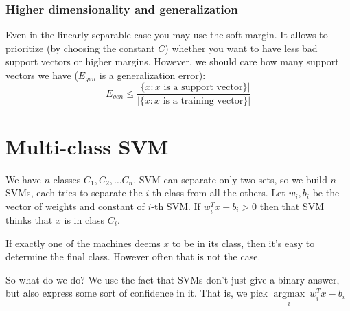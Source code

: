 \subsubsection*{Higher dimensionality and generalization}

Even in the linearly separable case you may use the soft margin. It allows to prioritize (by choosing the constant $C$) whether you want to have less bad support vectors or higher margins. However, we should care how many support vectors we have ($E_{gen}$ is a \hyperlink{gen_error}{generalization error}):
$$E_{gen}\le\frac{|\{x\colon x \text{ is a support vector}\}|}{|\{x\colon x \text{ is a training vector}\}|}$$

\section{Multi-class SVM}

We have $n$ classes $C_1, C_2, \ldots C_n$. SVM can separate only two sets, so we build $n$ SVMs, each tries to separate the $i$-th class from all the others. Let $w_i, b_i$ be the vector of weights and constant of $i$-th SVM. If $w_i^T x - b_i > 0$ then that SVM thinks that $x$ is in class $C_i$.

If exactly one of the machines deems $x$ to be in its class, then it's easy to determine the final class. However often that is not the case. 

So what do we do? We use the fact that SVMs don't just give a binary answer, but also express some sort of confidence in it. That is, we pick $\underset{i}{\operatorname{argmax}}\ w_i^T x - b_i$
